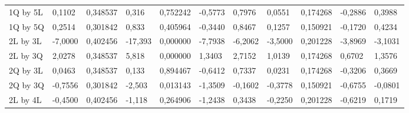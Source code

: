 \begin{table}[H]
{\begin{tabular}{lllllllllll}
\rowcolor[HTML]{FFFFFF} 
1Q by 5L       & 0,1102                          & 0,348537                        & 0,316                           & 0,752242                        & -0,5773                         & 0,7976                          & 0,0551                          & 0,174268                        & -0,2886                         & 0,3988                          \\
\rowcolor[HTML]{FFFFFF} 
1Q by 5Q       & 0,2514                          & 0,301842                        & 0,833                           & 0,405964                        & -0,3440                         & 0,8467                          & 0,1257                          & 0,150921                        & -0,1720                         & 0,4234                          \\
\rowcolor[HTML]{FFFFFF} 
2L by 3L       & {\color[HTML]{FF0000} -7,0000}  & {\color[HTML]{FF0000} 0,402456} & {\color[HTML]{FF0000} -17,393}  & {\color[HTML]{FF0000} 0,000000} & {\color[HTML]{FF0000} -7,7938}  & {\color[HTML]{FF0000} -6,2062}  & {\color[HTML]{FF0000} -3,5000}  & {\color[HTML]{FF0000} 0,201228} & {\color[HTML]{FF0000} -3,8969}  & {\color[HTML]{FF0000} -3,1031}  \\
\rowcolor[HTML]{FFFFFF} 
2L by 3Q       & {\color[HTML]{FF0000} 2,0278}   & {\color[HTML]{FF0000} 0,348537} & {\color[HTML]{FF0000} 5,818}    & {\color[HTML]{FF0000} 0,000000} & {\color[HTML]{FF0000} 1,3403}   & {\color[HTML]{FF0000} 2,7152}   & {\color[HTML]{FF0000} 1,0139}   & {\color[HTML]{FF0000} 0,174268} & {\color[HTML]{FF0000} 0,6702}   & {\color[HTML]{FF0000} 1,3576}   \\
\rowcolor[HTML]{FFFFFF} 
2Q by 3L       & 0,0463                          & 0,348537                        & 0,133                           & 0,894467                        & -0,6412                         & 0,7337                          & 0,0231                          & 0,174268                        & -0,3206                         & 0,3669                          \\
\rowcolor[HTML]{FFFFFF} 
2Q by 3Q       & {\color[HTML]{FF0000} -0,7556}  & {\color[HTML]{FF0000} 0,301842} & {\color[HTML]{FF0000} -2,503}   & {\color[HTML]{FF0000} 0,013143} & {\color[HTML]{FF0000} -1,3509}  & {\color[HTML]{FF0000} -0,1602}  & {\color[HTML]{FF0000} -0,3778}  & {\color[HTML]{FF0000} 0,150921} & {\color[HTML]{FF0000} -0,6755}  & {\color[HTML]{FF0000} -0,0801}  \\
\rowcolor[HTML]{FFFFFF} 
2L by 4L       & -0,4500                         & 0,402456                        & -1,118                          & 0,264906                        & -1,2438                         & 0,3438                          & -0,2250                         & 0,201228                        & -0,6219                         & 0,1719                          \\

\end{tabular}}
\end{table}
